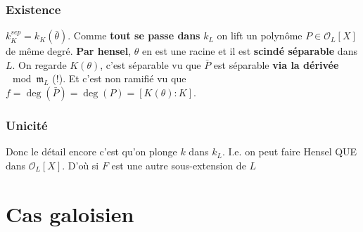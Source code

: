 \documentclass[a4paper,12pt]{book}
\newcommand{\Or}{\mathcal{O}}
\newcommand{\m}{\mathfrak m}
\theoremstyle{plain}
\theoremstyle{definition}
\theoremstyle{remark}
\begin{document}
\subsection{Existence}
$k_K^{sep}=k_K(\bar\theta)$. Comme \textbf{tout se passe dans} 
$k_L$ on lift un polynôme $P\in\Or_L[X]$ de même degré. 
\textbf{Par hensel},
$\theta$ en est une racine et il est \textbf{scindé séparable} dans
$L$. On regarde $K(\theta)$, c'est séparable vu que $\bar P$ est
séparable \textbf{via la dérivée} $\mod \m_L$ (!). Et c'est non
ramifié vu que $f=\deg(\bar P)=\deg(P)=[K(\theta):K]$.
\subsection{Unicité}
Donc le détail encore c'est qu'on plonge $k$ dans $k_L$. I.e.
on peut faire Hensel QUE dans $\Or_L[X]$. D'où si $F$ est
une autre sous-extension de $L$

\chapter{Cas galoisien}
\end{document}
